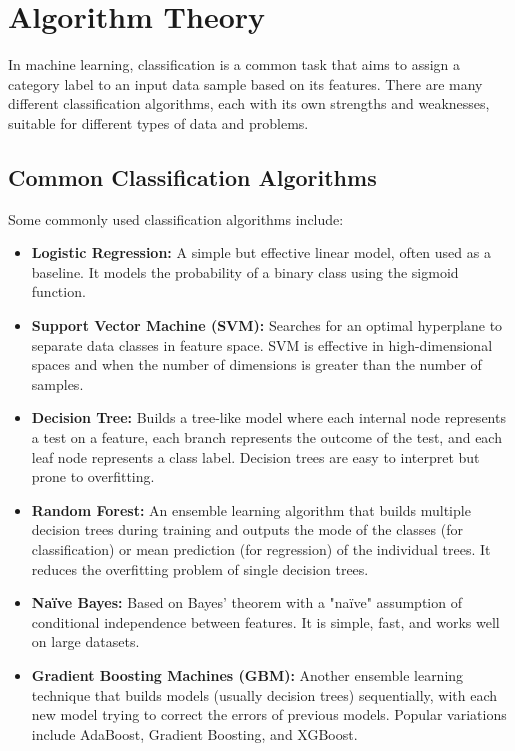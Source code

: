 \section{Algorithm Theory}

In machine learning, classification is a common task that aims to assign a category label to an input data sample based on its features. There are many different classification algorithms, each with its own strengths and weaknesses, suitable for different types of data and problems.

\subsection{Common Classification Algorithms}
Some commonly used classification algorithms include:
\begin{itemize}
    \item \textbf{Logistic Regression:} A simple but effective linear model, often used as a baseline. It models the probability of a binary class using the sigmoid function.
    \item \textbf{Support Vector Machine (SVM):} Searches for an optimal hyperplane to separate data classes in feature space. SVM is effective in high-dimensional spaces and when the number of dimensions is greater than the number of samples.
    \item \textbf{Decision Tree:} Builds a tree-like model where each internal node represents a test on a feature, each branch represents the outcome of the test, and each leaf node represents a class label. Decision trees are easy to interpret but prone to overfitting.
    \item \textbf{Random Forest:} An ensemble learning algorithm that builds multiple decision trees during training and outputs the mode of the classes (for classification) or mean prediction (for regression) of the individual trees. It reduces the overfitting problem of single decision trees.
    \item \textbf{Naïve Bayes:} Based on Bayes' theorem with a "naïve" assumption of conditional independence between features. It is simple, fast, and works well on large datasets.
    \item \textbf{Gradient Boosting Machines (GBM):} Another ensemble learning technique that builds models (usually decision trees) sequentially, with each new model trying to correct the errors of previous models. Popular variations include AdaBoost, Gradient Boosting, and XGBoost.
\end{itemize}


